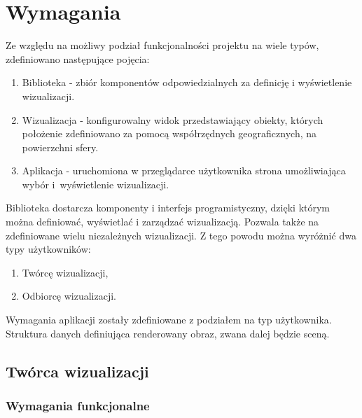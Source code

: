 \chapter{Wymagania}

Ze względu na możliwy podział funkcjonalności projektu na wiele typów, zdefiniowano następujące pojęcia:
\begin{enumerate}
    \item Biblioteka - zbiór komponentów odpowiedzialnych za definicję i wyświetlenie wizualizacji.
    \item Wizualizacja - konfigurowalny widok przedstawiający obiekty, których położenie zdefiniowano za pomocą współrzędnych geograficznych, na powierzchni sfery.
    \item Aplikacja - uruchomiona w przeglądarce użytkownika strona umożliwiająca wybór i~wyświetlenie wizualizacji.
\end{enumerate}

Biblioteka dostarcza komponenty i interfejs programistyczny, dzięki którym można definiować, wyświetlać i zarządzać wizualizacją.
Pozwala także na zdefiniowane wielu niezależnych wizualizacji. Z tego powodu można wyróżnić dwa typy użytkowników:

\begin{enumerate}
    \item Twórcę wizualizacji,
    \item Odbiorcę wizualizacji.
\end{enumerate}

Wymagania aplikacji zostały zdefiniowane z podziałem na typ użytkownika.
Struktura danych definiująca renderowany obraz, zwana dalej będzie sceną.


\section{Twórca wizualizacji}

\subsection{Wymagania funkcjonalne}

